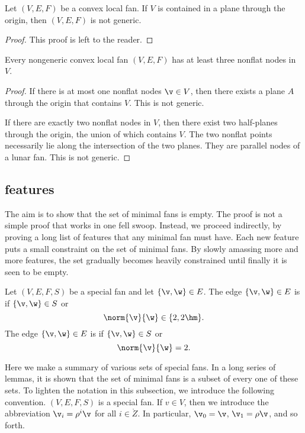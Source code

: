 \begin{lemma}[]
Let $(V,E,F)$ be a convex local fan.  If $V$ is contained in a plane
through the origin, then $(V,E,F)$ is not generic.
\end{lemma}

\begin{proof} This proof is left to the reader.
\end{proof}

\begin{lemma}[]\label{lemma:3-nonflat}
Every nongeneric convex local fan $(V,E,F)$ has at least three nonflat
nodes in $V$.
\end{lemma}

\begin{proof}
If there is at most one nonflat nodes $\v\in V$, then there exists
a plane $A$ through the origin that contains $V$.  This is not
generic.

If there are exactly two nonflat nodes in $V$, then
there exist two half-planes through the origin, the union of which contains
$V$.  The two nonflat points necessarily lie along the intersection
of the two planes.  They are parallel nodes of a lunar fan.
This is not generic.
\end{proof}

\subsection{features}

The aim is to show that the set of minimal fans is empty.  The proof
is not a simple proof that works in one fell swoop.  Instead, we
proceed indirectly, by proving a long list of features that any
minimal fan must have.  Each new feature puts a small constraint on
the set of minimal fans.  By slowly amassing more and more features,
the set gradually becomes heavily constrained until finally it is
seen to be empty.

\begin{definition}
 Let $(V,E,F,S)$ be a special fan
and let $\{\v,\w\}\in E$.  The edge $\{\v,\w\}\in E$ is
 if $\{\v,\w\}\in S$ or
\[ 
\norm{\v}{\w}\in\{2,2\hm\}.
\] 
The edge $\{\v,\w\}\in E$ is  if $\{\v,\w\}\in S$ or
\[ 
\norm{\v}{\w}=2.
\] 
\end{definition}

Here we make a summary of various sets of special fans. In a long
series of lemmas, it  is shown that the set of minimal fans is a
subset of every one of these sets.  To lighten the notation in this
subsection, we introduce the following convention.  $(V,E,F,S)$ is a
special fan.  If $v\in V$, then we introduce the abbreviation $\v_i =
\rho^i\v$ for all $i\in\ring{Z}$.  In particular, $\v_0=\v$,
$\v_1=\rho\v$, and so forth.

